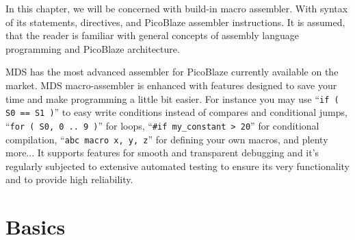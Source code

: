 In this chapter, we will be concerned with build-in macro assembler. With syntax of its statements, directives, and PicoBlaze assembler instructions. It is assumed, that the reader is familiar with general concepts of assembly language programming and PicoBlaze architecture.

MDS has the most advanced assembler for PicoBlaze currently available on the market. MDS macro-assembler is enhanced with features designed to save your time and make programming a little bit easier. For instance you may use ``\verb'if ( S0 == S1 )''' to easy write conditions instead of compares and conditional jumps, ``\verb'for ( S0, 0 .. 9 )''' for loops, ``\verb'#if my_constant > 20''' for conditional compilation, ``\verb'abc macro x, y, z''' for defining your own macros, and plenty more... It supports features for smooth and transparent debugging and it's regularly subjected to extensive automated testing to ensure its very functionality and to provide high reliability.

\section{Basics}

